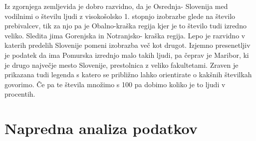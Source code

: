 \documentclass[11pt,a4paper]{article}
\begin{document}

Iz zgornjega zemljevida je dobro razvidno, da je Osrednja- Slovenija med vodilnimi o številu ljudi z visokošolsko 1. stopnjo izobrazbe glede na število prebivalcev, tik za njo pa je Obalno-kraška regija kjer je to število tudi izredno veliko. Sledita jima Gorenjska in Notranjsko- kraška regija. Lepo je razvidno v katerih predelih Slovenije pomeni izobrazba več kot drugot. Izjemno presenetljiv je podatek da ima Pomurska izrednjo malo takih ljudi, pa čeprav je Maribor, ki je drugo največje mesto Slovenije, prestolnica z veliko fakultetami. Zraven je prikazana tudi legenda s katero se približno lahko orientirate o kakšnih številkah govorimo. Če pa te števila množimo s 100 pa dobimo koliko je to ljudi v procentih.


\section{Napredna analiza podatkov}
\end{document}
